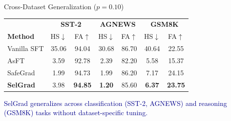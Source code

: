 \documentclass[aspectratio=169, 11pt]{beamer}
\newcommand{\takeaway}[1]{%
\vfill
\begin{center}
\colorbox{darkblue!8}{\parbox{0.92\textwidth}{\centering\small\textcolor{darkblue}{#1}}}
\end{center}
}
\begin{document}
\begin{frame}{Cross-Dataset Generalization ($p{=}0.10$)}
\vspace{4pt}
\centering
\small
\renewcommand{\arraystretch}{1.15}
\begin{tabular}{lcc|cc|cc}
\toprule
& \multicolumn{2}{c}{\textbf{SST-2}} & \multicolumn{2}{c}{\textbf{AGNEWS}} & \multicolumn{2}{c}{\textbf{GSM8K}} \\
\textbf{Method} & HS$\downarrow$ & FA$\uparrow$ & HS$\downarrow$ & FA$\uparrow$ & HS$\downarrow$ & FA$\uparrow$ \\
\midrule
Vanilla SFT & 35.06 & 94.04 & 30.68 & 86.70 & 40.64 & 22.55 \\
AsFT & 3.59 & 92.78 & 2.39 & 82.20 & 5.58 & 15.37 \\
SafeGrad & 1.99 & 94.73 & 1.99 & 86.20 & 7.17 & 24.15 \\
\rowcolor{green!10}
\textbf{SelGrad} & 3.98 & \textbf{94.85} & \textbf{1.20} & 85.60 & \textbf{6.37} & \textbf{23.75} \\
\bottomrule
\end{tabular}
\takeaway{SelGrad generalizes across classification (SST-2, AGNEWS) and reasoning (GSM8K) tasks without dataset-specific tuning.}
\end{frame}
\end{document}
